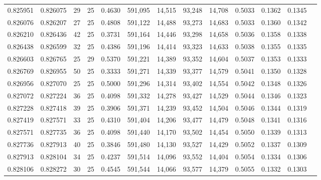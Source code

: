 \begin{tabular}{rrrrrrrrrrrrr}
0.825951 & 0.826075 &    29 &  25 &                                     0.4630 & 591,095 &  14,515 &  93,248 &  14,708 & 0.5033 & 0.1362 & 0.1345 \\
0.826076 & 0.826207 &    27 &  25 &                                     0.4808 & 591,122 &  14,488 &  93,273 &  14,683 & 0.5033 & 0.1360 & 0.1342 \\
0.826210 & 0.826436 &    42 &  25 &                                     0.3731 & 591,164 &  14,446 &  93,298 &  14,658 & 0.5036 & 0.1358 & 0.1338 \\
0.826438 & 0.826599 &    32 &  25 &                                     0.4386 & 591,196 &  14,414 &  93,323 &  14,633 & 0.5038 & 0.1355 & 0.1335 \\
0.826603 & 0.826765 &    25 &  29 &                                     0.5370 & 591,221 &  14,389 &  93,352 &  14,604 & 0.5037 & 0.1353 & 0.1333 \\
0.826769 & 0.826955 &    50 &  25 &                                     0.3333 & 591,271 &  14,339 &  93,377 &  14,579 & 0.5041 & 0.1350 & 0.1328 \\
0.826956 & 0.827070 &    25 &  25 &                                     0.5000 & 591,296 &  14,314 &  93,402 &  14,554 & 0.5042 & 0.1348 & 0.1326 \\
0.827072 & 0.827224 &    36 &  25 &                                     0.4098 & 591,332 &  14,278 &  93,427 &  14,529 & 0.5044 & 0.1346 & 0.1323 \\
0.827228 & 0.827418 &    39 &  25 &                                     0.3906 & 591,371 &  14,239 &  93,452 &  14,504 & 0.5046 & 0.1344 & 0.1319 \\
0.827419 & 0.827571 &    33 &  25 &                                     0.4310 & 591,404 &  14,206 &  93,477 &  14,479 & 0.5048 & 0.1341 & 0.1316 \\
0.827571 & 0.827735 &    36 &  25 &                                     0.4098 & 591,440 &  14,170 &  93,502 &  14,454 & 0.5050 & 0.1339 & 0.1313 \\
0.827736 & 0.827913 &    40 &  25 &                                     0.3846 & 591,480 &  14,130 &  93,527 &  14,429 & 0.5052 & 0.1337 & 0.1309 \\
0.827913 & 0.828104 &    34 &  25 &                                     0.4237 & 591,514 &  14,096 &  93,552 &  14,404 & 0.5054 & 0.1334 & 0.1306 \\
0.828106 & 0.828272 &    30 &  25 &                                     0.4545 & 591,544 &  14,066 &  93,577 &  14,379 & 0.5055 & 0.1332 & 0.1303 \\

\end{tabular}
